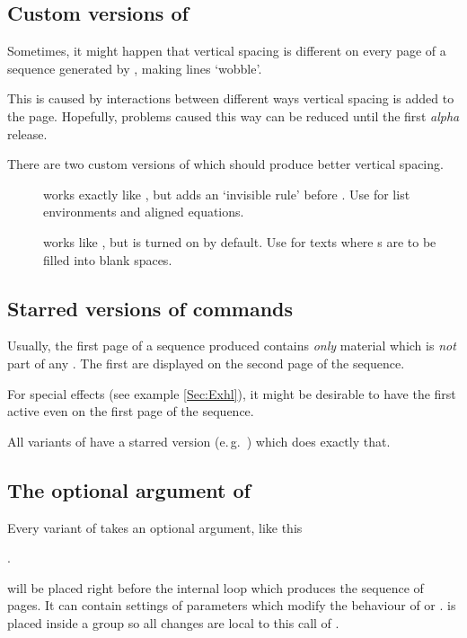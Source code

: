   \newslide

  \subsection{Custom versions of }%
  Sometimes, it might happen that vertical spacing is different on every page of a sequence generated by
  , making lines `wobble'.

  This is caused by interactions between different ways vertical spacing is added to the page. Hopefully, problems
  caused this way can be reduced until the first \emph{alpha} release.
  
  \newslide

  There are two custom versions of  which should produce better vertical spacing.
  \begin{description}
  \item[] works exactly like , but adds an
    `invisible rule' before . Use for list environments and aligned equations.
  \item[] works like , but
     is turned on by default. Use for texts where s are to be filled into blank
    spaces.
  \end{description}

  \newslide

  \subsection{Starred versions of  commands}\label{Sec:StarredStepwise}%
  Usually, the first page of a sequence produced contains \emph{only} material which is \emph{not} part of any
  . The first  are displayed on the second page of the sequence.

  For special effects (see example \ref{Sec:Exhl}), it might be desirable to have the first  active
  even on the first page of the sequence.

  All variants of   have a starred version (e.\,g.\ ) which does exactly that.

  \newslide

  \subsection{The optional argument of }%
  Every variant of  takes an optional argument, like this
  \begin{center}
    .
  \end{center}
   will be placed right before the internal loop which produces the sequence of pages.  It can 
  contain settings of parameters which modify the behaviour of  or . 
  is placed inside a group so all changes are local to this call of .

